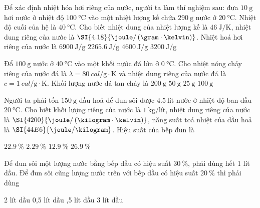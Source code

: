 \begin{ex}
Để xác định nhiệt hóa hơi riêng của nước, người ta làm thí nghiệm sau: đưa $\SI{10}{\gram}$ hơi nước ở nhiệt độ $\SI{100}{\celsius}$ vào một nhiệt lượng kế chứa $\SI{290}{\gram}$ nước ở $\SI{20}{\celsius}$. Nhiệt độ cuối của hệ là $\SI{40}{\celsius}$. Cho biết nhiệt dung của nhiệt lượng kế là  $\SI{46}{\joule/\kelvin}$, nhiệt dung riêng của nước là $\SI{4.18}{\joule/\left(\gram\cdot\kelvin\right)}$. Nhiệt hoá hơi riêng của nước là 
	\choice
	{$\SI{6900}{\joule/\gram}$}
	{\True $\SI{2265.6}{\joule/\gram}$}
	{$\SI{4600}{\joule/\gram}$}
	{$\SI{3200}{\joule/\gram}$}
\end{ex}
\begin{ex}
	Đổ $\SI{100}{\gram}$ nước ở $\SI{40}{\celsius}$ vào một khối nước đá lớn ở $\SI{0}{\celsius}$. Cho nhiệt nóng chảy riêng của nước đá là $\lambda=\SI{80}{cal/\gram\cdot\kelvin}$ và nhiệt dung riêng của nước đá là $c=\SI{1}{cal/\gram\cdot\kelvin}$. Khối lượng nước đá tan chảy là
	\choice
	{$\SI{200}{\gram}$}
	{\True $\SI{50}{\gram}$}
	{$\SI{25}{\gram}$}
	{$\SI{100}{\gram}$}
\end{ex}
\begin{ex}
	Người ta phải tốn $\SI{150}{\gram}$ dầu hoả để đun sôi được $\SI{4.5}{\text{lít}}$ nước ở nhiệt độ ban đầu $\SI{20}{\celsius}$. Cho biết khối lượng riêng của nước là $\SI{1}{\kilogram/\text{lít}}$, nhiệt dung riêng của nước là $\SI{4200}{\joule/\left(\kilogram\cdot\kelvin\right)}$, năng suất toả nhiệt của dầu hoả là $\SI{44E6}{\joule/\kilogram}$. Hiệu suất của bếp đun là
	
	\choice
	{\True $\SI{22.9}{\percent}$}
	{$\SI{2.29}{\percent}$}
	{$\SI{12.9}{\percent}$}
	{$\SI{26.9}{\percent}$}
\end{ex}
\begin{ex}
	Để đun sôi một lượng nước bằng bếp dầu có hiệu suất $\SI{30}{\percent}$, phải dùng hết 1 lít dầu. Để đun sôi cũng lượng nước trên với bếp dầu có hiệu suất $\SI{20}{\percent}$ thì phải dùng
	
	\choice
	{2 lít dầu}
	{0,5 lít dầu}
	{,5 lít dầu}
	{3 lít dầu}
\end{ex}
